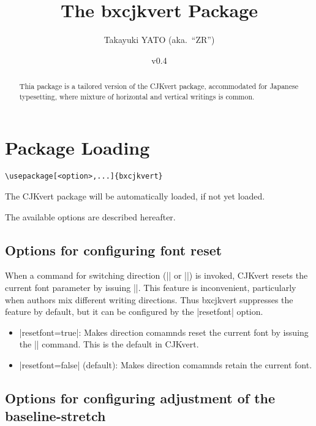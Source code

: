 \documentclass[a4paper]{article}
\newcommand{\PkgVersion}{0.4}
\newcommand{\PkgDate}{2016/11/11}
\newcommand{\Pkg}[1]{\textsf{#1}}
\newcommand{\Means}{:\hspace{1em plus 1em}}
\begin{document}
\title{The \Pkg{bxcjkvert} Package}
\author{Takayuki YATO (aka.~``ZR'')}
\date{v\PkgVersion\quad[\PkgDate]}
\maketitle

\begin{abstract}
Thia package is a tailored version of the \Pkg{CJKvert} package,
accommodated for Japanese typesetting,
where mixture of horizontal and vertical writings is common.
\end{abstract}

\tableofcontents

\section{Package Loading}
\label{sec:loading}

\begin{verbatim}
\usepackage[<option>,...]{bxcjkvert}
\end{verbatim}

The \Pkg{CJKvert} package will be automatically loaded,
if not yet loaded.

The available options are described hereafter.

\subsection{Options for configuring font reset}

When a command for switching direction (|\CJKhorz| or |\CJKvert|)
is invoked, \Pkg{CJKvert} resets the current font parameter
by issuing |\normalfont|.
This feature is inconvenient, particularly
when authors mix different writing directions.
Thus \Pkg{bxcjkvert} suppresses the feature by default,
but it can be configured by the |resetfont| option.

\begin{itemize}
\item |resetfont=true|\Means
  Makes direction comamnds reset the current font by issuing
  the |\normalfont| command.
  This is the default in \Pkg{CJKvert}.
\item |resetfont=false| (default)\Means
  Makes direction comamnds retain the current font.
\end{itemize}

\subsection{Options for configuring adjustment of the baseline-stretch}
\end{document}
